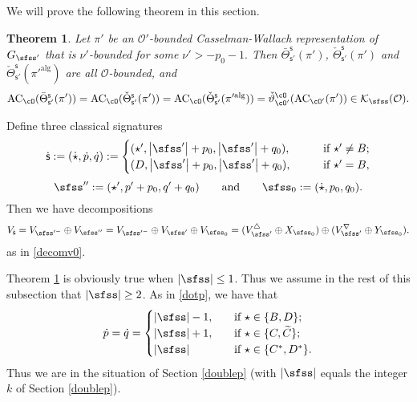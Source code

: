 \documentclass[12pt,a4paper]{amsart}
\def\abs#1{\left|{#1}\right|}
\newcommand{\CK}{{\mathcal {K}}}
\newcommand{\CO}{{\mathcal {O}}}
\newcommand{\g}{\mathfrak g}
\numberwithin{equation}{section}
\newtheorem{thm}{Theorem}[section]
\theoremstyle{remark}
\def\Thetab{\bar{\Theta}}
\begin{document}
We will prove the following theorem in this section. 
\begin{thm}\label{thm:GDS.AC}
  Let $\pi'$ be an $\CO'$-bounded Casselman-Wallach representation of $G_{\sfss'}$  that is  $\nu'$-bounded for some
$
  \nu'>
 -p_0-1.
$
Then $\Thetab_{\mathsf s'}^{\mathsf s}(\pi')$, $\check \Theta_{\mathsf s'}^{\mathsf s}(\pi')$  and $\check \Theta_{\mathsf s'}^{\mathsf s}(\pi'^{\mathrm{alg}})$ are all $\CO$-bounded,  and
    \[
  \mathrm{AC}_{\cO}(\Thetab_{\mathsf s'}^{\mathsf s}(\pi'))=    \mathrm{AC}_{\cO}(\check \Theta_{\mathsf s'}^{\mathsf s}(\pi'))= \mathrm{AC}_{\cO}(\check \Theta_{\mathsf s'}^{\mathsf s}(\pi'^{\mathrm{alg}}))=   \check \vartheta_{\cO'}^\cO(\mathrm{AC}_{\cO'}(\pi'))\in \CK_\sfss(\CO).
  \]
\end{thm}




  


  Define three classical signatures
\[
  \dsfss:=(\dot \star, \dot p, \dot q):=\begin{cases}
    (\star', \abs{\sfss'}+p_0,  \abs{\sfss'}+q_0), \qquad  &\textrm{if $\star'\neq B$}; \\
        (D, \abs{\sfss'}+p_0,  \abs{\sfss'}+q_0),\qquad  &\textrm{if $\star'=B$},
  \end{cases}
\]
\[
  \sfss'':=(\star', p'+p_0, q'+q_0)\qquad\textrm{and}\qquad \sfss_0:=(\dot \star, p_0, q_0). %
  \]
Then we have decompositions 
\[
  V_{\dsfss}=V_{\sfss'^-}\oplus V_{\sfss''}= V_{\sfss'^-}\oplus V_{\sfss'}\oplus  V_{\sfss_0}= (V_{\sfss'}^\triangle \oplus X_{\sfss_0})\oplus (V_{\sfss'}^\nabla \oplus Y_{\sfss_0}).
\]
as in \eqref{decomv0}. 

Theorem \ref{thm:GDS.AC} is obviously true when $\abs{\sfss}\leq 1$. Thus  we  assume in the rest of this subsection that $\abs{\sfss}\geq 2$. As in \eqref{dotp}, we have that 
\[
 \dot p=\dot q= \begin{cases}
 \abs{\sfss}-1,\quad   &\textrm{if } \star\in \{B,D\};\\
 \abs{\sfss}+1,  & \textrm{if $\star\in \{C, \widetilde C\}$;}\\
 \abs{\sfss} & \textrm{if $ \star\in\{C^*,D^*\}$.}
\end{cases}
\]
Thus we are in the situation of 
Section \ref{doublep} (with $\abs{\sfss}$ equals the integer $k$ of Section \ref{doublep}).
\end{document}

